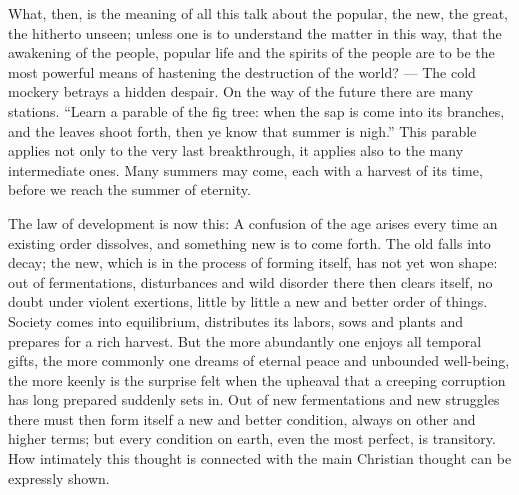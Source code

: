 \documentclass[12pt,a4paper,openany]{book}
\newcommand{\opage}[1]{\marginnote{\footnotesize\textit{[#1]}}}
\begin{document}
What, then, is the meaning of all this talk about the popular,
the new, the great, the hitherto unseen; unless
one is to understand the matter in this way, that the awakening of the people,
popular life and the spirits of the people are to be the most powerful
means of hastening the destruction of the world? --- The
cold mockery betrays a hidden despair. On the way of the future
there are many stations. ``Learn a parable
of the fig tree: when the sap is come into its branches,
and the leaves shoot forth, then ye know that summer is nigh.''
This parable applies not only to the very last
breakthrough, it applies also to the many intermediate ones.
Many summers may come, each with a
harvest of its time, before we reach the summer of eternity.

The law of development is now this: A confusion of the age
arises every time an existing order dissolves, and
something new is to come forth. The old falls into decay; the new,
which is in the process of forming itself, has not yet
\setcounter{footnote}{0}%
\opage{42}won shape: out of fermentations, disturbances and wild
disorder there then clears itself, no doubt under violent
exertions, little by little a new and better order
of things. Society comes into equilibrium, distributes its
labors, sows and plants and prepares for a rich
harvest. But the more abundantly one enjoys all temporal gifts,
the more commonly one dreams of eternal peace and unbounded
well-being, the more keenly is the surprise felt
when the upheaval that a creeping corruption
has long prepared suddenly sets in. Out of
new fermentations and new struggles there must then form itself a new and
better condition, always on other and higher terms;
but every condition on earth, even the most perfect,
is transitory. How intimately this thought is connected
with the main Christian thought can be expressly
shown.
\end{document}
